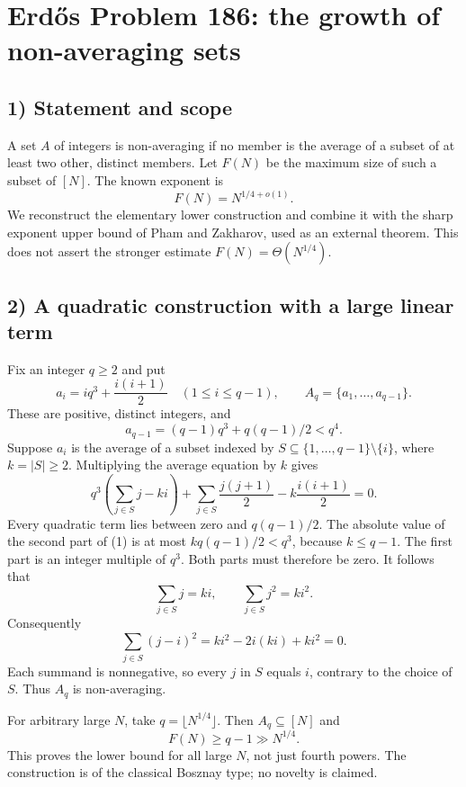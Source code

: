 \section{Erd\H{o}s Problem 186: the growth of non-averaging sets}

\subsection{1) Statement and scope}
A set $A$ of integers is non-averaging if no member is the average
of a subset of at least two other, distinct members. Let $F(N)$ be the
maximum size of such a subset of $[N]$. The known exponent is
\[
 F(N)=N^{1/4+o(1)}.
\]
We reconstruct the elementary lower construction and combine it with
the sharp exponent upper bound of Pham and Zakharov, used as an external
theorem. This does not assert the stronger estimate $F(N)=\Theta(N^{1/4})$.

\subsection{2) A quadratic construction with a large linear term}
Fix an integer $q\geq2$ and put
\[
 a_i=iq^3+\frac{i(i+1)}2\quad(1\leq i\leq q-1),
 \qquad A_q=\{a_1,\ldots,a_{q-1}\}.
\]
These are positive, distinct integers, and
\[
 a_{q-1}=(q-1)q^3+q(q-1)/2<q^4.
\]
Suppose $a_i$ is the average of a subset indexed by
$S\subseteq\{1,\ldots,q-1\}\setminus\{i\}$, where $k=|S|\geq2$.
Multiplying the average equation by $k$ gives
\[
 q^3\left(\sum_{j\in S}j-ki\right)
 +\sum_{j\in S}\frac{j(j+1)}2-k\frac{i(i+1)}2=0.        \tag{1}
\]
Every quadratic term lies between zero and $q(q-1)/2$. The absolute
value of the second part of (1) is at most
$kq(q-1)/2<q^3$, because $k\leq q-1$. The first part is an integer
multiple of $q^3$. Both parts must therefore be zero. It follows that
\[
 \sum_{j\in S}j=ki,\qquad \sum_{j\in S}j^2=ki^2.
\]
Consequently
\[
 \sum_{j\in S}(j-i)^2
 =ki^2-2i(ki)+ki^2=0.
\]
Each summand is nonnegative, so every $j$ in $S$ equals $i$, contrary
to the choice of $S$. Thus $A_q$ is non-averaging.

For arbitrary large $N$, take $q=\lfloor N^{1/4}\rfloor$.
Then $A_q\subseteq[N]$ and
\[
 F(N)\geq q-1\gg N^{1/4}.                              \tag{2}
\]
This proves the lower bound for all large $N$, not just fourth powers.
The construction is of the classical Bosznay type; no novelty is claimed.

